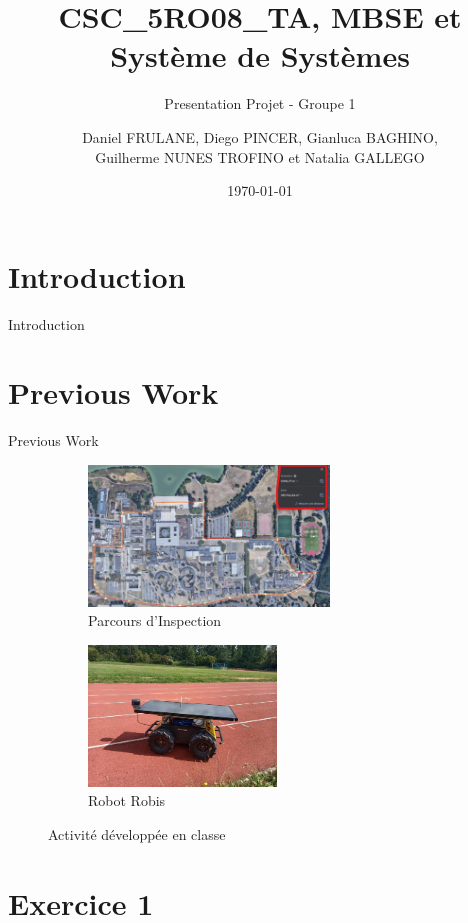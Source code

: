 \documentclass[aspectratio=1610]{beamer}
\date{\today}
\title{CSC\_5RO08\_TA, MBSE et Système de Systèmes}
\subtitle{Presentation Projet - Groupe 1}
\author{Daniel FRULANE, Diego PINCER, Gianluca BAGHINO,\\Guilherme NUNES TROFINO et Natalia GALLEGO}
\institute{ENSTA Paris}
\begin{document}
    \maketitle


    \section{Introduction}
    \begin{frame}{Introduction}
        \tableofcontents
    \end{frame}


    \section*{Previous Work}
    \begin{frame}{Previous Work}
        \begin{figure}[H]
            \centering
            \begin{subfigure}[b]{0.475\textwidth}
                \centering
                \includegraphics[height=3.75cm]{./images/EX0/CSC_5RO08_TA_path_2.png}
                  \caption{Parcours d'Inspection}
            \end{subfigure}\hfill
            \begin{subfigure}[b]{0.475\textwidth}
                \centering
                \includegraphics[height=3.75cm]{./images/EX0/CSC_5RO08_TA_robis.png}
                \caption{Robot Robis}
            \end{subfigure}
            \caption{Activité développée en classe}
        \end{figure}
    \end{frame}


    \section{Exercice 1}
\end{document}
